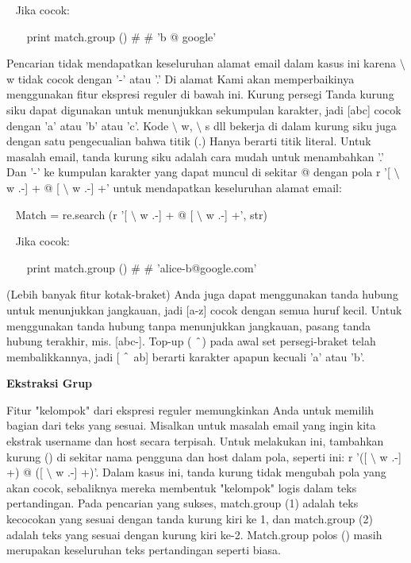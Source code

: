 \begin {enumerate}
~ Jika cocok: \par
\noindent 
~~~ print match.group ()  $  \#  $ $  \#  $ 'b @ google' \par
\vspace{12pt}
Pencarian tidak mendapatkan keseluruhan alamat email dalam kasus ini karena  $  \setminus  $ w tidak cocok dengan '-' atau '.' Di alamat Kami akan memperbaikinya menggunakan fitur ekspresi reguler di bawah ini. Kurung persegi Tanda kurung siku dapat digunakan untuk menunjukkan sekumpulan karakter, jadi [abc] cocok dengan 'a' atau 'b' atau 'c'. Kode  $  \setminus  $ w,  $  \setminus  $ s dll bekerja di dalam kurung siku juga dengan satu pengecualian bahwa titik (.) Hanya berarti titik literal. Untuk masalah email, tanda kurung siku adalah cara mudah untuk menambahkan '.' Dan '-' ke kumpulan karakter yang dapat muncul di sekitar @ dengan pola r '[ $  \setminus  $ w .-] + @ [ $  \setminus  $ w .-] +' untuk mendapatkan keseluruhan alamat email: \par
\vspace{12pt}
\noindent 
~ Match = re.search (r '[ $  \setminus  $ w .-] + @ [ $  \setminus  $ w .-] +', str) \par
\noindent 
~ Jika cocok: \par
\noindent 
~~~ print match.group ()  $  \#  $ $  \#  $ 'alice-b@google.com' \par
\vspace{12pt}
(Lebih banyak fitur kotak-braket) Anda juga dapat menggunakan tanda hubung untuk menunjukkan jangkauan, jadi [a-z] cocok dengan semua huruf kecil. Untuk menggunakan tanda hubung tanpa menunjukkan jangkauan, pasang tanda hubung terakhir, mis. [abc-]. Top-up ( $  \string^  $) pada awal set persegi-braket telah membalikkannya, jadi [ $  \string^  $ ab] berarti karakter apapun kecuali 'a' atau 'b'. \par
\vspace{16pt}
{\fontsize{14pt}{14pt}\selectfont \textbf{Ekstraksi Grup} \\} \par
Fitur "kelompok" dari ekspresi reguler memungkinkan Anda untuk memilih bagian dari teks yang sesuai. Misalkan untuk masalah email yang ingin kita ekstrak username dan host secara terpisah. Untuk melakukan ini, tambahkan kurung () di sekitar nama pengguna dan host dalam pola, seperti ini: r '([ $  \setminus  $ w .-] +) @ ([ $  \setminus  $ w .-] +)'. Dalam kasus ini, tanda kurung tidak mengubah pola yang akan cocok, sebaliknya mereka membentuk "kelompok" logis dalam teks pertandingan. Pada pencarian yang sukses, match.group (1) adalah teks kecocokan yang sesuai dengan tanda kurung kiri ke 1, dan match.group (2) adalah teks yang sesuai dengan kurung kiri ke-2. Match.group polos () masih merupakan keseluruhan teks pertandingan seperti biasa. \par

\end{enumerate}
